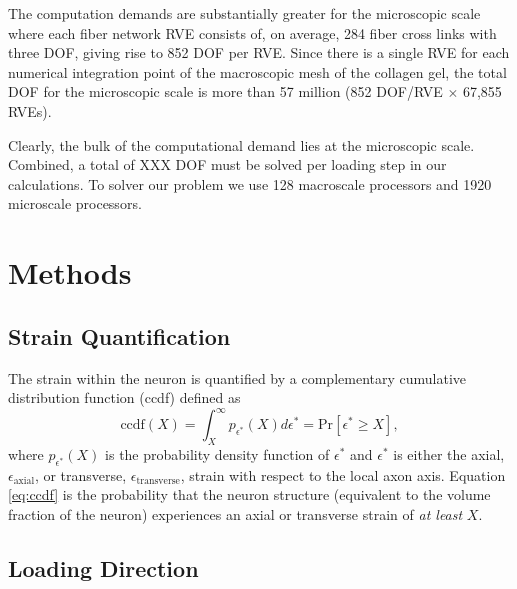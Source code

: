 \documentclass[]{interact}
\begin{document}
The computation demands are substantially greater for the microscopic scale where each fiber network RVE consists of, on average, 284 fiber cross links with three DOF, giving rise to 852 DOF per RVE. Since there is a single RVE for each numerical integration point of the macroscopic mesh of the collagen gel, the total DOF for the microscopic scale is more than 57 million (852 DOF/RVE $\times$ 67,855 RVEs). 

Clearly, the bulk of the computational demand lies at the microscopic scale. 
Combined, a total of XXX DOF must be solved per loading step in our calculations. To solver our problem we use 128 macroscale processors and 1920 microscale processors. 
\section{Methods}
\label{sec:methods}

\subsection{Strain Quantification}
\label{subsec:strain_quant}
The strain within the neuron is quantified by a complementary cumulative distribution function (ccdf) defined as 
%
\begin{equation}
\text{ccdf}(X) = \int_{X}^{\infty} p_{\epsilon^*}(X)d\epsilon^* = \text{Pr}[ \epsilon^*\ge X],
\label{eq:ccdf}
\end{equation}
%
where $p_{\epsilon^*}(X)$ is the probability density function of $\epsilon^*$ and $\epsilon^*$ is either the axial, $\epsilon_{\text{axial}}$, or transverse, $\epsilon_{\text{transverse}}$, strain with respect to the local axon axis. Equation \ref{eq:ccdf} is the probability that the neuron structure (equivalent to the volume fraction of the neuron) experiences an axial or transverse strain of \textit{at least} $X$. 

\subsection{Loading Direction}
\label{subsec:load_direction}
\end{document}
